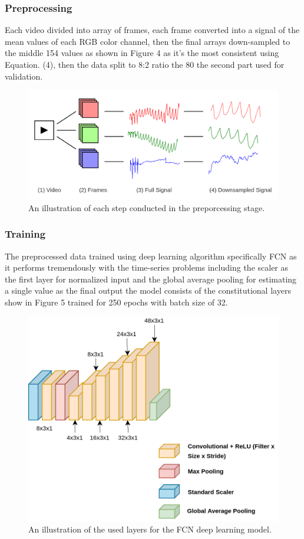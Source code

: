 \documentclass{bmcart}
\begin{document}
\subsubsection*{Preprocessing}
Each video divided into array of frames, each frame converted into a signal of
the mean values of each RGB color channel, then the final arrays down-sampled to
the middle 154 values as shown in Figure 4 as it's the most consistent using
Equation. (4), then the data split to 8:2 ratio the 80%
the second part used for validation.
\begin{figure}[h!]
  \includegraphics[width=.9\linewidth]{png_images/preporcessing.png}
  \caption{
      An illustration of each step conducted in the preporcessing stage.}
\end{figure}
\FloatBarrier

\subsubsection*{Training}
The preprocessed data trained using deep learning algorithm specifically FCN as
it performs tremendously with the time-series problems including the scaler as
the first layer for normalized input and the global average pooling for
estimating a single value as the final output the model consists of the
constitutional layers show in Figure 5 trained for 250 epochs with batch size of
32.
\begin{figure}[h!]
  \includegraphics[width=.9\linewidth]{png_images/spo2_model.png}
  \caption{
  An illustration of the used layers for the FCN deep learning model.}
\end{figure}
\FloatBarrier
\end{document}
